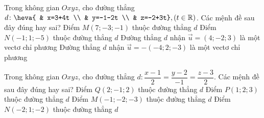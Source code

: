 \begin{ex}%
	Trong không gian $Oxyz$, cho đường thẳng $d\colon \heva{
		& x=3+4t \\ 
		& y=-1-2t \\ 
		& z=-2+3t},( t\in \mathbb{R})$. Các mệnh đề sau đây đúng hay sai?
	\choiceTF
	{ Điểm $M\left( 7;-3;-1 \right)$ thuộc đường thẳng $d$}
	{ \True Điểm $N\left( -1;1;-5 \right)$ thuộc đường thẳng $d$}
	{\True  Đường thẳng $d$ nhận $\overrightarrow{u}=\left( 4;-2;3 \right)$ là một vectơ chỉ phương}
	{\True  Đường thẳng $d$ nhận $\overrightarrow{u}=-\left( -4;2;-3 \right)$ là một vectơ chỉ phương}
\end{ex}
\begin{ex}%
	Trong không gian $Oxyz$, cho đường thẳng $d \colon \dfrac{x-1}{2}=\dfrac{y-2}{-1}=\dfrac{z-3}{2}$. Các mệnh đề sau đây đúng hay sai?
	\choiceTF
	{ Điểm $Q\left( 2;-1;2 \right)$ thuộc đường thẳng $d$}
	{ \True Điểm $P\left( 1;2;3 \right)$ thuộc đường thẳng $d$}
	{ Điểm $M\left( -1;-2;-3 \right)$ thuộc đường thẳng $d$}
	{ Điểm $N\left( -2;1;-2 \right)$ thuộc đường thẳng $d$}
\end{ex}
